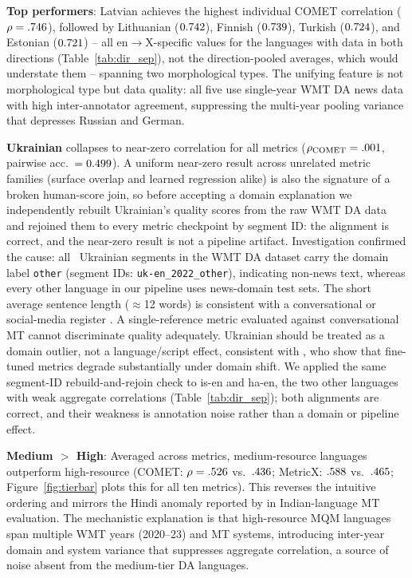 \documentclass[11pt]{article}
\begin{document}
\textbf{Top performers}: Latvian achieves the highest individual COMET correlation ($\rho = .746$), followed by Lithuanian ($0.742$), Finnish ($0.739$), Turkish ($0.724$), and Estonian ($0.721$) -- all en$\to$X-specific values for the languages with data in both directions (Table~\ref{tab:dir_sep}), not the direction-pooled averages, which would understate them -- spanning two morphological types. The unifying feature is not morphological type but data quality: all five use single-year WMT DA news data with high inter-annotator agreement, suppressing the multi-year pooling variance that depresses Russian and German.

\textbf{Ukrainian} collapses to near-zero correlation for all metrics ($\rho_{\text{COMET}} = .001$, pairwise acc.\ $= 0.499$). A uniform near-zero result across unrelated metric families (surface overlap and learned regression alike) is also the signature of a broken human-score join, so before accepting a domain explanation we independently rebuilt Ukrainian's quality scores from the raw WMT DA data and rejoined them to every metric checkpoint by segment ID: the alignment is correct, and the near-zero result is not a pipeline artifact. Investigation confirmed the cause: all \LangNUK\ Ukrainian segments in the WMT DA dataset carry the domain label \texttt{other} (segment IDs: \texttt{uk-en\_2022\_other}), indicating non-news text, whereas every other language in our pipeline uses news-domain test sets. The short average sentence length ($\approx$12 words) is consistent with a conversational or social-media register \cite{kocmi2024findings}. A single-reference metric evaluated against conversational MT cannot discriminate quality adequately. Ukrainian should be treated as a domain outlier, not a language/script effect, consistent with \citet{zouhar2024domain}, who show that fine-tuned metrics degrade substantially under domain shift. We applied the same segment-ID rebuild-and-rejoin check to is-en and ha-en, the two other languages with weak aggregate correlations (Table~\ref{tab:dir_sep}); both alignments are correct, and their weakness is annotation noise rather than a domain or pipeline effect.

\textbf{Medium $>$ High}: Averaged across metrics, medium-resource languages outperform high-resource (COMET: $\rho=.526$ vs.\ $.436$; MetricX: $.588$ vs.\ $.465$; Figure~\ref{fig:tierbar} plots this for all ten metrics). This reverses the intuitive ordering and mirrors the Hindi anomaly reported by \citet{yari2025item} in Indian-language MT evaluation. The mechanistic explanation is that high-resource MQM languages span multiple WMT years (2020--23) and MT systems, introducing inter-year domain and system variance that suppresses aggregate correlation, a source of noise absent from the medium-tier DA languages.
\end{document}
